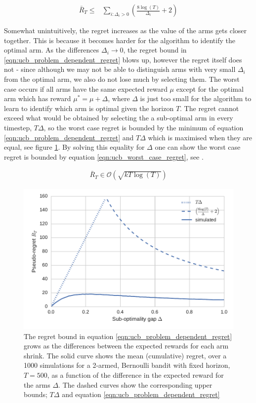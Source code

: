 \documentclass[11pt,a4paper,twoside]{report}
\newcommand{\eqn}[1]{\begin{align}#1\end{align}}
\newcommand{\bigo}[1]{\mathcal{O}\left( #1 \right)}
\newcommand{\regret}{\bar{R}_{T}} %
\theoremstyle{plain}
\theoremstyle{definition}
\begin{document}
\eqn {
\label{eqn:ucb_problem_dependent_regret}
\regret \leq & \sum_{i:\Delta_i > 0}\left(\frac{8\log(T)}{\Delta_i}+2 \right)
}

Somewhat unintuitively, the regret increases as the value of the arms gets closer together. This is because it becomes harder for the algorithm to identify the optimal arm. As the differences $\Delta_i \rightarrow 0$, the regret bound in \ref{eqn:ucb_problem_dependent_regret} blows up, however the regret itself does not - since although we may not be able to distinguish arms with very small $\Delta_i$ from the optimal arm, we also do not lose much by selecting them. The worst case occurs if all arms have the same expected reward $\mu$ except for the optimal arm which has reward $\mu^*=\mu+\Delta$, where $\Delta$ is just too small for the algorithm to learn to identify which arm is optimal given the horizon $T$. The regret cannot exceed what would be obtained by selecting the a sub-optimal arm in every timestep, $T\Delta$, so the worst case regret is bounded by the minimum of equation \ref{eqn:ucb_problem_dependent_regret} and $T\Delta$ which is maximised when they are equal, see figure \ref{fig:ucb_regret_vs_delta}. By solving this equality for $\Delta$ one can show the worst case regret is bounded by equation \ref{eqn:ucb_worst_case_regret}, see \citet{Bubeck2012}.

\eqn{
\label{eqn:ucb_worst_case_regret}
\regret \in \bigo{\sqrt{kT\log(T)}}
}  

\begin{figure}
\includegraphics[scale=1]{ucb_regret_vs_delta}
\caption{The regret bound in equation \ref{eqn:ucb_problem_dependent_regret} grows as the differences between the expected rewards for each arm shrink. The solid curve shows the mean (cumulative) regret, over a 1000 simulations for a 2-armed, Bernoulli bandit with fixed horizon, $T = 500$, as a function of the difference in the expected reward for the arms $\Delta$. The dashed curves show the corresponding upper bounds; $T\Delta$ and equation \ref{eqn:ucb_problem_dependent_regret}}
\label{fig:ucb_regret_vs_delta}
\end{figure}
\end{document}
